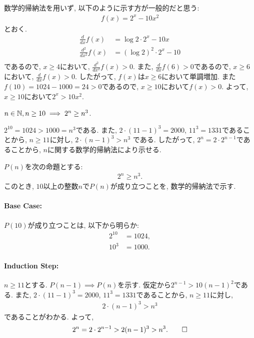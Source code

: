 \begin{rem}
  数学的帰納法を用いず, 以下のように示す方が一般的だと思う:
  \begin{align*}
    f(x)=2^x-10x^2
  \end{align*}
  とおく.
  \begin{align*}
    \frac{d}{dx}f(x)&=\log 2 \cdot 2^x-10x\\
    \frac{d^2}{dx^2}f(x)&=(\log 2)^2 \cdot 2^x-10\\
  \end{align*}
  であるので, $x\geq 4$において,
  $\frac{d^2}{dx^2}f(x)>0$.
  また, $\frac{d}{dx}f(6)>0$であるので,
  $x\geq 6$において,
  $\frac{d}{dx}f(x)> 0$.
  したがって, $f(x)$は$x\geq 6$において単調増加.
  また$f(10)=1024-1000=24>0$であるので,
  $x\geq 10$において$f(x) > 0$.
  よって, $x\geq 10$において$2^x > 10x^2$.
\end{rem}

\begin{prop}
  \label{p:20230818}
  $n\in\mathbb{N}, n\geq 10\implies 2^n\geq n^3$.
\end{prop}
\begin{proof**}
  $2^{10}=1024>1000=n^3$である.
  また, $2\cdot(11-1)^3=2000$, $11^3=1331$であることから,
  $n\geq 11$に対し,
  $2\cdot (n-1)^3>n^3$
  である.
  したがって,
  $2^n=2\cdot 2^{n-1}$であることから,
  $n$に関する数学的帰納法により示せる.
\end{proof**}
\begin{proof*}
  $P(n)$を次の命題とする:
  \begin{align*}
    2^n\geq n^3
    .
  \end{align*}
  このとき,
  $10$以上の整数$n$で$P(n)$が成り立つことを,
  数学的帰納法で示す.

  \paragraph{Base Case:}
  $P(10)$が成り立つことは, 以下から明らか:
  \begin{align*}
    2^{10}&=1024,\\
    10^3&=1000.
  \end{align*}
  \paragraph{Induction Step:}
  $n\geq 11$とする.
  $P(n-1)\implies P(n)$を示す.
  仮定から$2^{n-1} > 10(n-1)^2$である.
  また, $2\cdot(11-1)^3=2000$, $11^3=1331$であることから,
  $n\geq 11$に対し,
  \begin{align*}
    2\cdot (n-1)^3>n^3
  \end{align*}
  であることがわかる.
  よって,
  \begin{align*}
    2^n=2\cdot 2^{n-1}>2(n-1)^3>n^3
    .\qedhere
  \end{align*}
\end{proof*}

